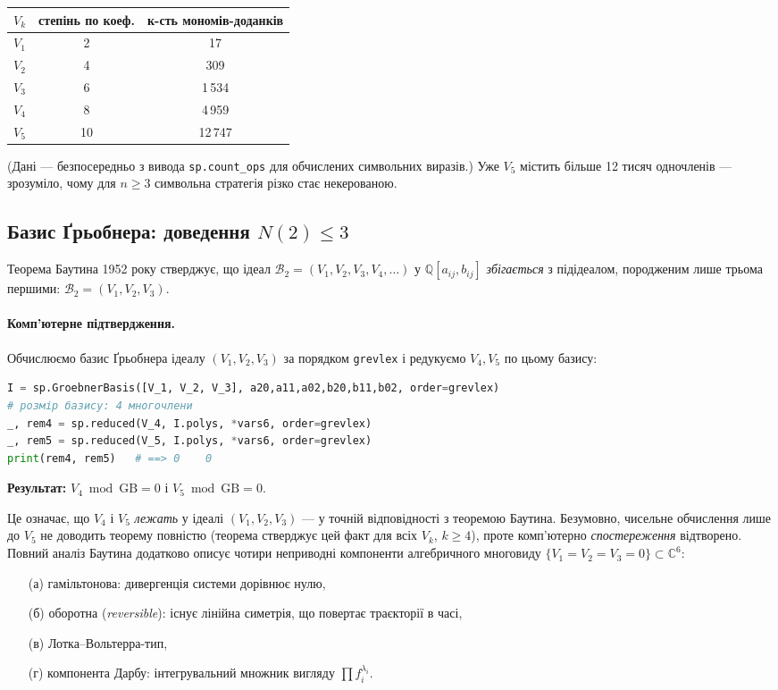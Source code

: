 \documentclass[12pt,a4paper]{article}
\begin{document}
\begin{center}
\begin{tabular}{ccc}
\toprule
$V_k$ & степінь по коеф. & к-сть мономів-доданків \\
\midrule
$V_1$ & 2 & 17 \\
$V_2$ & 4 & 309 \\
$V_3$ & 6 & 1\,534 \\
$V_4$ & 8 & 4\,959 \\
$V_5$ & 10 & 12\,747 \\
\bottomrule
\end{tabular}
\end{center}

(Дані --- безпосередньо з вивода \texttt{sp.count\_ops} для обчислених
символьних виразів.) Уже $V_5$ містить більше 12 тисяч одночленів --- зрозуміло, чому
для $n\geq 3$ символьна стратегія різко стає некерованою.

\subsection{Базис Ґрьобнера: доведення $N(2)\leq 3$}

Теорема Баутина 1952 року стверджує, що ідеал
$\mathcal{B}_2 = (V_1, V_2, V_3, V_4, \ldots)$ у $\mathbb{Q}[a_{ij}, b_{ij}]$ \emph{збігається} з підідеалом, породженим лише трьома першими: $\mathcal{B}_2 = (V_1, V_2, V_3)$.

\paragraph{Комп'ютерне підтвердження.}
Обчислюємо базис Ґрьобнера ідеалу $(V_1, V_2, V_3)$ за порядком \texttt{grevlex} і
редукуємо $V_4, V_5$ по цьому базису:
\begin{lstlisting}[language=Python]
I = sp.GroebnerBasis([V_1, V_2, V_3], a20,a11,a02,b20,b11,b02, order=grevlex)
# розмір базису: 4 многочлени
_, rem4 = sp.reduced(V_4, I.polys, *vars6, order=grevlex)
_, rem5 = sp.reduced(V_5, I.polys, *vars6, order=grevlex)
print(rem4, rem5)   # ==> 0    0
\end{lstlisting}
\textbf{Результат:} $V_4 \bmod \mathrm{GB} = 0$ і $V_5 \bmod \mathrm{GB} = 0$.

Це означає, що $V_4$ і $V_5$ \emph{лежать} у ідеалі $(V_1, V_2, V_3)$ --- у точній відповідності з теоремою Баутина. Безумовно, чисельне обчислення лише до $V_5$ не доводить теорему повністю (теорема стверджує цей факт для всіх $V_k$, $k\geq 4$), проте комп'ютерно \emph{спостереження} відтворено. Повний аналіз Баутина додатково описує чотири неприводні компоненти алгебричного многовиду $\{V_1=V_2=V_3=0\}\subset\mathbb{C}^6$:
\begin{itemize}
    \item[(а)] гамільтонова: дивергенція системи дорівнює нулю,
    \item[(б)] оборотна (\emph{reversible}): існує лінійна симетрія, що повертає траєкторії в часі,
    \item[(в)] Лотка--Вольтерра-тип,
    \item[(г)] компонента Дарбу: інтегрувальний множник вигляду $\prod f_i^{\lambda_i}$.
\end{itemize}
\end{document}
